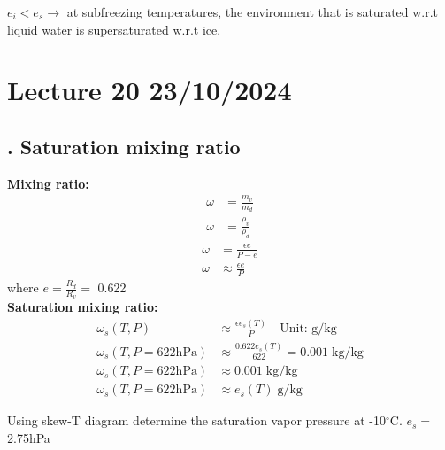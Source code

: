 \documentclass[fleqn,10pt]{SelfArx} %
\begin{document}
$e_i < e_s \rightarrow$ at subfreezing temperatures, the environment that is saturated w.r.t liquid water is supersaturated w.r.t ice.

\clearpage

\section{Lecture 20 23/10/2024}
\subsection{. Saturation mixing ratio}

\textbf{Mixing ratio:}
\begin{align}
    \omega &= \frac{m_v}{m_d} \\
    \omega &= \frac{\rho_v}{\rho_d}
\end{align}
\begin{align}
    \omega &= \frac{\epsilon e}{P - e} \\
    \omega &\approx \frac{\epsilon e}{P}
\end{align}
where $e=\frac{R_d}{R_v}=$ 0.622 \\
\newline
\textbf{Saturation mixing ratio:}
\begin{align}
    \omega_s(T,P) &\approx \frac{\epsilon e_s(T)}{P} \quad \text{Unit: g/kg} \\
    \omega_s(T,P=622\text{hPa}) &\approx \frac{0.622 e_s(T)}{622} = 0.001 \; \text{kg/kg} \\
    \omega_s(T,P=622\text{hPa}) &\approx 0.001 \; \text{kg/kg} \\
    \omega_s(T,P=622\text{hPa}) &\approx e_s(T) \; \text{g/kg} 
\end{align}

\begin{question}[\label:20.1]{Using skew-T diagram determine the saturation vapor pressure at -10$^\circ$C.}
    \Rightarrow $e_s=$2.75hPa
\end{question}
\begin{figure}[!ht]
    \centering
\end{figure}
\end{document}
